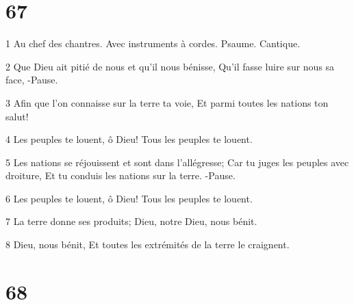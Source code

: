 \chapter{67}

\par 1 Au chef des chantres. Avec instruments à cordes. Psaume. Cantique.
\par 2 Que Dieu ait pitié de nous et qu'il nous bénisse, Qu'il fasse luire sur nous sa face, -Pause.
\par 3 Afin que l'on connaisse sur la terre ta voie, Et parmi toutes les nations ton salut!
\par 4 Les peuples te louent, ô Dieu! Tous les peuples te louent.
\par 5 Les nations se réjouissent et sont dans l'allégresse; Car tu juges les peuples avec droiture, Et tu conduis les nations sur la terre. -Pause.
\par 6 Les peuples te louent, ô Dieu! Tous les peuples te louent.
\par 7 La terre donne ses produits; Dieu, notre Dieu, nous bénit.
\par 8 Dieu, nous bénit, Et toutes les extrémités de la terre le craignent.

\chapter{68}

